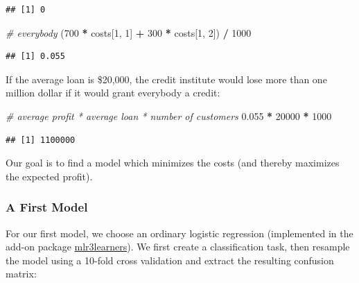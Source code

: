\documentclass[]{article}
\newenvironment{Shaded}{\begin{snugshade}}{\end{snugshade}}
\newcommand{\CommentTok}[1]{\textcolor[rgb]{0.56,0.35,0.01}{\textit{#1}}}
\newcommand{\DecValTok}[1]{\textcolor[rgb]{0.00,0.00,0.81}{#1}}
\newcommand{\FloatTok}[1]{\textcolor[rgb]{0.00,0.00,0.81}{#1}}
\newcommand{\KeywordTok}[1]{\textcolor[rgb]{0.13,0.29,0.53}{\textbf{#1}}}
\newcommand{\NormalTok}[1]{#1}
\newcommand{\OperatorTok}[1]{\textcolor[rgb]{0.81,0.36,0.00}{\textbf{#1}}}
\newcommand{\StringTok}[1]{\textcolor[rgb]{0.31,0.60,0.02}{#1}}
\renewenvironment{Shaded} {\begin{snugshade}\small} {\end{snugshade}}
\begin{document}
\begin{verbatim}
## [1] 0
\end{verbatim}

\begin{Shaded}
\begin{Highlighting}[]
\CommentTok{# everybody}
\NormalTok{(}\DecValTok{700} \OperatorTok{*}\StringTok{ }\NormalTok{costs[}\DecValTok{1}\NormalTok{, }\DecValTok{1}\NormalTok{] }\OperatorTok{+}\StringTok{ }\DecValTok{300} \OperatorTok{*}\StringTok{ }\NormalTok{costs[}\DecValTok{1}\NormalTok{, }\DecValTok{2}\NormalTok{]) }\OperatorTok{/}\StringTok{ }\DecValTok{1000}
\end{Highlighting}
\end{Shaded}

\begin{verbatim}
## [1] 0.055
\end{verbatim}

If the average loan is \$20,000, the credit institute would lose more than one million dollar if it would grant everybody a credit:

\begin{Shaded}
\begin{Highlighting}[]
\CommentTok{# average profit * average loan * number of customers}
\FloatTok{0.055} \OperatorTok{*}\StringTok{ }\DecValTok{20000} \OperatorTok{*}\StringTok{ }\DecValTok{1000}
\end{Highlighting}
\end{Shaded}

\begin{verbatim}
## [1] 1100000
\end{verbatim}

Our goal is to find a model which minimizes the costs (and thereby maximizes the expected profit).

\hypertarget{a-first-model}{%
\subsubsection{A First Model}\label{a-first-model}}

For our first model, we choose an ordinary logistic regression (implemented in the add-on package \href{https://mlr3learners.mlr-org.com}{mlr3learners}).
We first create a classification task, then resample the model using a 10-fold cross validation and extract the resulting confusion matrix:

\begin{Shaded}
\end{Shaded}
\end{document}
